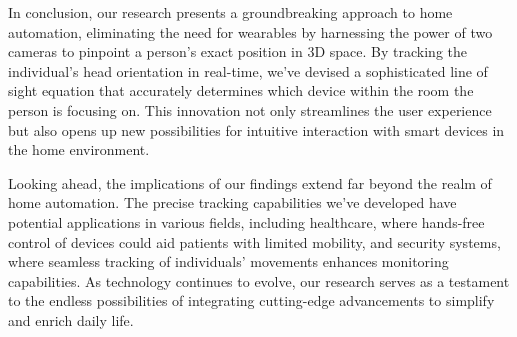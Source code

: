 In conclusion, our research presents a groundbreaking approach to home automation, eliminating the need for wearables by harnessing the power of two cameras to pinpoint a person's exact position in 3D space. By tracking the individual's head orientation in real-time, we've devised a sophisticated line of sight equation that accurately determines which device within the room the person is focusing on. This innovation not only streamlines the user experience but also opens up new possibilities for intuitive interaction with smart devices in the home environment.

Looking ahead, the implications of our findings extend far beyond the realm of home automation. The precise tracking capabilities we've developed have potential applications in various fields, including healthcare, where hands-free control of devices could aid patients with limited mobility, and security systems, where seamless tracking of individuals' movements enhances monitoring capabilities. As technology continues to evolve, our research serves as a testament to the endless possibilities of integrating cutting-edge advancements to simplify and enrich daily life.
